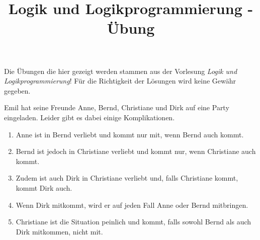 \documentclass[10pt, a4paper]{exam}
\title{Logik und Logikprogrammierung - Übung}
\author{}
\date{}
\begin{document}
\begin{myboxii}[Disclaimer]
    Die Übungen die hier gezeigt werden stammen aus der Vorlesung \textit{Logik und Logikprogrammierung}! Für die Richtigkeit der Lösungen wird keine Gewähr gegeben.
\end{myboxii}

\begin{questions}
    \question Emil hat seine Freunde Anne, Bernd, Christiane und Dirk auf eine Party eingeladen. Leider gibt es dabei einige Komplikationen.
    \begin{enumerate}
        \item Anne ist in Bernd verliebt und kommt nur mit, wenn Bernd auch kommt.
        \item Bernd ist jedoch in Christiane verliebt und kommt nur, wenn Christiane auch kommt.
        \item Zudem ist auch Dirk in Christiane verliebt und, falls Christiane kommt, kommt Dirk auch.
        \item Wenn Dirk mitkommt, wird er auf jeden Fall Anne oder Bernd mitbringen.
        \item Christiane ist die Situation peinlich und kommt, falls sowohl Bernd als auch Dirk mitkommen, nicht mit.
    \end{enumerate}

\end{questions}
\end{document}
